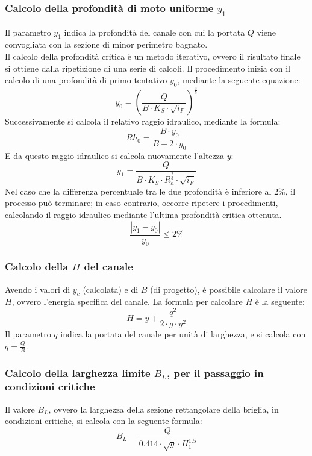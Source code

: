 \subsubsection*{Calcolo della profondità di moto uniforme $y_1$}
Il parametro $y_1$ indica la profondità del canale con cui la portata $Q$ viene convogliata con la sezione di minor perimetro bagnato.\\
Il calcolo della profondità critica è un metodo iterativo, ovvero il risultato finale si ottiene dalla ripetizione di una serie di calcoli.
Il procedimento inizia con il calcolo di una profondità di primo tentativo $y_0$, mediante la seguente equazione:
\begin{equation}
    y_0 = \left ( \frac{Q}{B \cdot K_S \cdot \sqrt{i_F}} \right) ^ {\frac{3}{5}}
    \label{prof_critica_tentativo}
\end{equation} 
Successivamente si calcola il relativo raggio idraulico, mediante la formula:
\begin{equation}
    Rh_0 = \frac{B \cdot y_0}{B + 2\cdot y_0}
    \label{raggio_idraulico}
\end{equation} 
E da questo raggio idraulico si calcola nuovamente l'altezza $y$:
\begin{equation}
    y_1 = \frac{Q}{B \cdot K_S \cdot R_h ^\frac{2}{3} \cdot \sqrt{i_F}}
    \label{prof_critica}
\end{equation} 
Nel caso che la differenza percentuale tra le due profondità è inferiore al 2\%, il processo può terminare; in caso contrario, occorre ripetere i procedimenti, calcolando il raggio idraulico mediante l'ultima profondità critica ottenuta.
\begin{equation}
    \frac{|y_1 - y_0|}{y_0} \le 2\%
    \label{scostamento_prof_critica}
\end{equation} 
\subsubsection*{Calcolo della $H$ del canale}
Avendo i valori di $y_c$ (calcolata) e di $B$ (di progetto), è possibile calcolare il valore $H$, ovvero l'energia specifica del canale.
La formula per calcolare $H$ è la seguente: 
\begin{equation}
    H = y + \frac{q^2}{2 \cdot g \cdot y^2}
    \label{energia_specifica_canale}
\end{equation} 
Il parametro $q$ indica la portata del canale per unità di larghezza, e si calcola con $q = \frac{Q}{B}$.
\subsubsection*{Calcolo della larghezza limite $B_L$, per il passaggio in condizioni critiche}
Il valore $B_L$, ovvero la larghezza della sezione rettangolare della briglia, in condizioni critiche, si calcola con la seguente formula:
\begin{equation}
    B_L = \frac{Q}{0.414 \cdot \sqrt{g} \cdot H_1 ^{1.5}}
    \label{larghezza_specifica}
\end{equation}